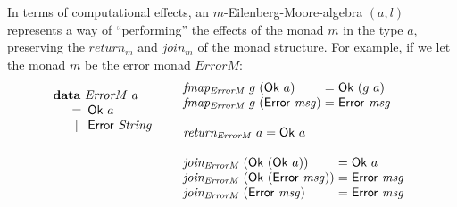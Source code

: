 \documentclass{jfp1}
\newcommand{\kw}[1]{\textbf{#1}}
\begin{document}
In terms of computational effects, an $m$-Eilenberg-Moore-algebra $(a,
l)$ represents a way of ``performing'' the effects of the monad $m$ in
the type $a$, preserving the $\mathit{return}_m$ and $\mathit{join_m}$
of the monad structure. For example, if we let the monad $m$ be the
error monad $\mathit{ErrorM}$:
\begin{displaymath}
  \begin{array}{ll}
    \begin{array}[t]{l}
      \kw{data}~\mathit{ErrorM}~a \\
      \quad
      \begin{array}{c@{\hspace{0.5em}}l}
        = & \mathsf{Ok}~a \\
        | & \mathsf{Error}~\mathit{String}
      \end{array}
    \end{array}
    &
    \begin{array}[t]{l}
      \begin{array}{@{}l@{\hspace{0.3em}}l@{\hspace{0.3em}}l@{\hspace{0.3em}}c@{\hspace{0.3em}}l}
        \mathit{fmap_{ErrorM}}&g&(\mathsf{Ok}~a) &=& \mathsf{Ok}~(g~a) \\
        \mathit{fmap_{ErrorM}}&g&(\mathsf{Error}~\mathit{msg}) &=& \mathsf{Error}~\mathit{msg} \\
      \end{array} \\
      \\
      \mathit{return_{ErrorM}}~a = \mathsf{Ok}~a \\
      \\
      \begin{array}{@{}l@{\hspace{0.3em}}l@{\hspace{0.3em}}c@{\hspace{0.3em}}l}
        \mathit{join_{ErrorM}}&(\mathsf{Ok}~(\mathsf{Ok}~a)) &=& \mathsf{Ok}~a \\
        \mathit{join_{ErrorM}}&(\mathsf{Ok}~(\mathsf{Error}~\mathit{msg})) &=& \mathsf{Error}~\mathit{msg} \\
        \mathit{join_{ErrorM}}&(\mathsf{Error}~\mathit{msg}) &=& \mathsf{Error}~\mathit{msg}
      \end{array}
    \end{array}
  \end{array}
\end{displaymath}
\end{document}
